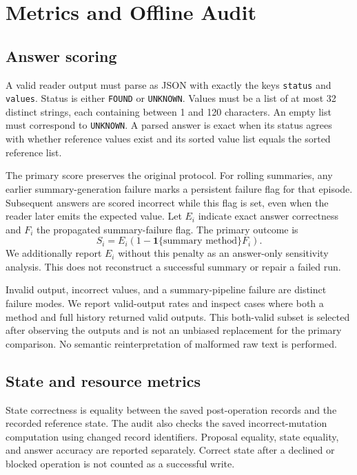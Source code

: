 \documentclass[11pt,a4paper]{article}
\begin{document}
\section{Metrics and Offline Audit}
\subsection{Answer scoring}\label{sec:scoring}
A valid reader output must parse as JSON with exactly the keys \texttt{status} and \texttt{values}. Status is either \texttt{FOUND} or \texttt{UNKNOWN}. Values must be a list of at most 32 distinct strings, each containing between 1 and 120 characters. An empty list must correspond to \texttt{UNKNOWN}. A parsed answer is exact when its status agrees with whether reference values exist and its sorted value list equals the sorted reference list.

The primary score preserves the original protocol. For rolling summaries, any earlier summary-generation failure marks a persistent failure flag for that episode. Subsequent answers are scored incorrect while this flag is set, even when the reader later emits the expected value. Let $E_i$ indicate exact answer correctness and $F_i$ the propagated summary-failure flag. The primary outcome is
\begin{equation}
S_i = E_i\left(1-\mathbf{1}\{\text{summary method}\}F_i\right).
\end{equation}
We additionally report $E_i$ without this penalty as an answer-only sensitivity analysis. This does not reconstruct a successful summary or repair a failed run.

Invalid output, incorrect values, and a summary-pipeline failure are distinct failure modes. We report valid-output rates and inspect cases where both a method and full history returned valid outputs. This both-valid subset is selected after observing the outputs and is not an unbiased replacement for the primary comparison. No semantic reinterpretation of malformed raw text is performed.

\subsection{State and resource metrics}
State correctness is equality between the saved post-operation records and the recorded reference state. The audit also checks the saved incorrect-mutation computation using changed record identifiers. Proposal equality, state equality, and answer accuracy are reported separately. Correct state after a declined or blocked operation is not counted as a successful write.
\end{document}

